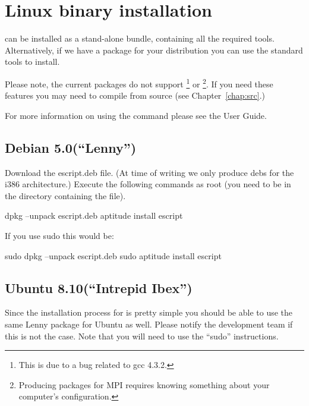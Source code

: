 
%
%
%

\section{Linux binary installation}
\label{sec:binlinux}

\esfinley can be installed as a stand-alone bundle, containing all the required tools.
Alternatively, if we have a package for your distribution you can use the standard tools to install.

Please note, the current packages do not support \openmp\footnote{This is due to a bug related to gcc 4.3.2.} or \mpi\footnote{Producing packages for MPI requires knowing something about your computer's configuration.}.
If you need these features you may need to compile \esfinley from source (see Chapter~\ref{chap:src}.)

For more information on using the  command please see the User Guide.

\subsection{Debian 5.0(``Lenny'')}

Download the escript.deb file.
(At time of writing we only produce debs for the i386 architecture.)
Execute the following commands as root (you need to be in the directory containing the file).
\begin{shellCode}
 dpkg --unpack escript.deb
 aptitude install escript
\end{shellCode}

If you use sudo this would be:
\begin{shellCode}
sudo dpkg --unpack escript.deb
sudo aptitude install escript
\end{shellCode}

\subsection{Ubuntu 8.10(``Intrepid Ibex'')}

Since the installation process for \esfinley is pretty simple you should be able to use the same Lenny package for Ubuntu as well.
Please notify the development team if this is not the case.
Note that you will need to use the ``sudo'' instructions.


